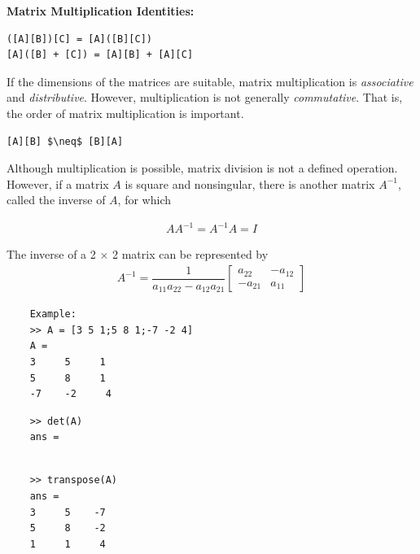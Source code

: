 \documentclass[book.tex]{subfiles}
\begin{document}
\begin{margintable}
	\textbf{Matrix Multiplication Identities:}
\begin{Verbatim}
([A][B])[C] = [A]([B][C])
[A]([B] + [C]) = [A][B] + [A][C]
\end{Verbatim}
\end{margintable}

If the dimensions of the matrices are suitable, matrix multiplication is \textit{associative} and \textit{distributive}. However, multiplication is not generally \textit{commutative}. That is, the order of matrix multiplication is important.

\begin{margintable}
\begin{lstlisting}
[A][B] $\neq$ [B][A]
\end{lstlisting}
\end{margintable}

Although multiplication is possible, matrix division is not a defined operation. However, if a matrix $A$ is square and nonsingular, there is another matrix $A^{-1}$, called the inverse of $A$, for which

\begin{align}
AA^{-1} = A^{-1}A = I
\end{align}


The inverse of a 2 $\times$ 2 matrix can be represented by
\begin{align}
A^{-1} = \dfrac{1}{a_{11}a_{22}-a_{12}a_{21}}	\begin{bmatrix}
a_{22} & -a_{12} \\
-a_{21} & a_{11} 
\end{bmatrix}
\end{align}

\begin{margintable}
	\begin{verbatim}
	Example:
	>> A = [3 5 1;5 8 1;-7 -2 4]
	A =
	3     5     1
	5     8     1
	-7    -2     4
	\end{verbatim}
\end{margintable}

\begin{margintable}
	\begin{verbatim}	
	>> det(A)
	ans =	
	
	\end{verbatim}
\end{margintable}

\begin{margintable}
	\begin{verbatim}
	>> transpose(A) 
	ans =
	3     5    -7
	5     8    -2
	1     1     4
	\end{verbatim}
\end{margintable}
\end{document}
